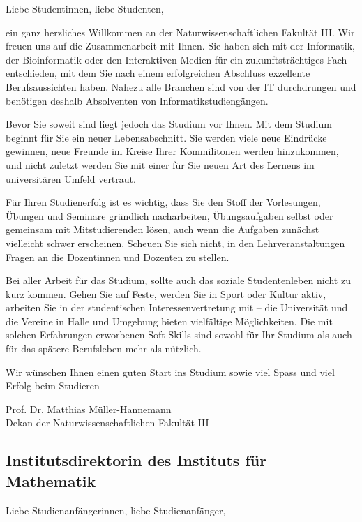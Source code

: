 Liebe Studentinnen, liebe Studenten,

ein ganz herzliches Willkommen an der Naturwissenschaftlichen Fakultät III.
Wir freuen uns auf die Zusammenarbeit mit Ihnen.
Sie haben sich mit der Informatik, der Bioinformatik oder den Interaktiven Medien für ein
zukunftsträchtiges Fach entschieden, mit dem Sie nach einem
erfolgreichen Abschluss exzellente Berufsaussichten haben.
Nahezu alle Branchen sind von der IT durchdrungen und benötigen deshalb
Absolventen von Informatikstudiengängen.

Bevor Sie soweit sind liegt jedoch das Studium vor Ihnen.
Mit dem Studium beginnt für Sie ein neuer Lebensabschnitt.
Sie werden viele neue Eindrücke gewinnen, neue Freunde im Kreise Ihrer
Kommilitonen werden
hinzukommen, und nicht zuletzt werden Sie mit einer für Sie neuen Art
des Lernens im universitären Umfeld vertraut.

Für Ihren Studienerfolg ist es wichtig, dass Sie den Stoff der Vorlesungen, Übungen und Seminare gründlich nacharbeiten, Übungsaufgaben selbst oder gemeinsam mit Mitstudierenden lösen, auch wenn die Aufgaben zunächst vielleicht schwer erscheinen. Scheuen Sie sich nicht, in den Lehrveranstaltungen Fragen an die
Dozentinnen und Dozenten zu stellen.

Bei aller Arbeit für das Studium, sollte auch das soziale Studentenleben
nicht zu kurz kommen. Gehen Sie auf Feste, werden Sie in Sport oder
Kultur aktiv, arbeiten Sie in der studentischen Interessenvertretung mit
-- die Universität und die Vereine in Halle und Umgebung bieten
vielfältige Möglichkeiten.
Die mit solchen Erfahrungen erworbenen Soft-Skills sind
sowohl für Ihr Studium als auch für das spätere Berufsleben mehr als
nützlich.

Wir wünschen Ihnen einen guten Start ins Studium sowie viel Spass und
viel Erfolg beim Studieren

Prof. Dr. Matthias Müller-Hannemann\\
Dekan der Naturwissenschaftlichen Fakultät III

\newpage

 \subsection{Institutsdirektorin des Instituts für Mathematik}
 
 Liebe Studienanfängerinnen, liebe Studienanfänger,
 
